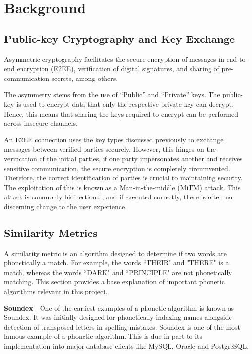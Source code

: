 \section{Background}

\subsection{Public-key Cryptography and Key Exchange}
Asymmetric cryptography facilitates the secure encryption of messages
in end-to-end encryption (E2EE), verification of digital signatures, and
sharing of pre-communication secrets, among others.

The asymmetry stems from the use of ``Public'' and ``Private'' keys. The
public-key is used to encrypt data that only the respective private-key
can decrypt. Hence, this means that sharing the keys required to encrypt
can be performed across insecure channels.

An E2EE connection uses the key types discussed previously to exchange messages between verified parties securely. However, this hinges
on the verification of the initial parties, if one party impersonates another and receives sensitive communication, the secure encryption is
completely circumvented. Therefore, the correct identification of parties is crucial to maintaining security. The exploitation of this is known as a Man-in-the-middle (MiTM) attack. This attack is commonly bidirectional, and if executed correctly, there is often no discerning change to the user experience.

\subsection{Similarity Metrics}
\label{sec:similarity_metric}
A similarity metric is an algorithm designed to determine if two words are phonetically a match. For example, the words ``THEIR" and "THERE" is a match, whereas the words ``DARK" and ``PRINCIPLE" are not phonetically matching. This section provides a base explanation of important phonetic algorithms relevant in this project.

\textbf{Soundex} - One of the earliest examples of a phonetic algorithm is known as Soundex. It was initially designed for phonetically indexing names alongside detection of transposed letters in spelling mistakes.  Soundex is one of the most famous example of a phonetic algorithm. This is due in part to its implementation into major database clients like MySQL\cite{mysql_soundex}, Oracle\cite{moved_2005} and PostgreSQL\cite{postgresql}.

